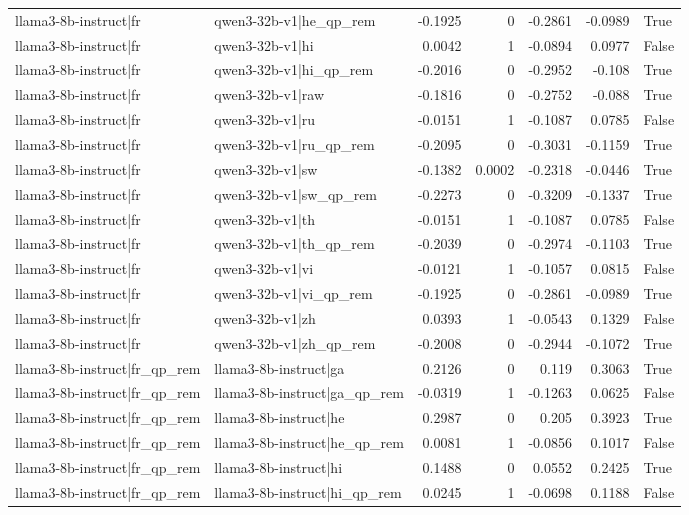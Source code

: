 \begin{table}
\begin{tabular}{l l r r r r l}
llama3-8b-instruct|fr & qwen3-32b-v1|he_qp_rem & -0.1925 & 0 & -0.2861 & -0.0989 & True \\
llama3-8b-instruct|fr & qwen3-32b-v1|hi & 0.0042 & 1 & -0.0894 & 0.0977 & False \\
llama3-8b-instruct|fr & qwen3-32b-v1|hi_qp_rem & -0.2016 & 0 & -0.2952 & -0.108 & True \\
llama3-8b-instruct|fr & qwen3-32b-v1|raw & -0.1816 & 0 & -0.2752 & -0.088 & True \\
llama3-8b-instruct|fr & qwen3-32b-v1|ru & -0.0151 & 1 & -0.1087 & 0.0785 & False \\
llama3-8b-instruct|fr & qwen3-32b-v1|ru_qp_rem & -0.2095 & 0 & -0.3031 & -0.1159 & True \\
llama3-8b-instruct|fr & qwen3-32b-v1|sw & -0.1382 & 0.0002 & -0.2318 & -0.0446 & True \\
llama3-8b-instruct|fr & qwen3-32b-v1|sw_qp_rem & -0.2273 & 0 & -0.3209 & -0.1337 & True \\
llama3-8b-instruct|fr & qwen3-32b-v1|th & -0.0151 & 1 & -0.1087 & 0.0785 & False \\
llama3-8b-instruct|fr & qwen3-32b-v1|th_qp_rem & -0.2039 & 0 & -0.2974 & -0.1103 & True \\
llama3-8b-instruct|fr & qwen3-32b-v1|vi & -0.0121 & 1 & -0.1057 & 0.0815 & False \\
llama3-8b-instruct|fr & qwen3-32b-v1|vi_qp_rem & -0.1925 & 0 & -0.2861 & -0.0989 & True \\
llama3-8b-instruct|fr & qwen3-32b-v1|zh & 0.0393 & 1 & -0.0543 & 0.1329 & False \\
llama3-8b-instruct|fr & qwen3-32b-v1|zh_qp_rem & -0.2008 & 0 & -0.2944 & -0.1072 & True \\
llama3-8b-instruct|fr_qp_rem & llama3-8b-instruct|ga & 0.2126 & 0 & 0.119 & 0.3063 & True \\
llama3-8b-instruct|fr_qp_rem & llama3-8b-instruct|ga_qp_rem & -0.0319 & 1 & -0.1263 & 0.0625 & False \\
llama3-8b-instruct|fr_qp_rem & llama3-8b-instruct|he & 0.2987 & 0 & 0.205 & 0.3923 & True \\
llama3-8b-instruct|fr_qp_rem & llama3-8b-instruct|he_qp_rem & 0.0081 & 1 & -0.0856 & 0.1017 & False \\
llama3-8b-instruct|fr_qp_rem & llama3-8b-instruct|hi & 0.1488 & 0 & 0.0552 & 0.2425 & True \\
llama3-8b-instruct|fr_qp_rem & llama3-8b-instruct|hi_qp_rem & 0.0245 & 1 & -0.0698 & 0.1188 & False \\

\end{tabular}
\end{table}
